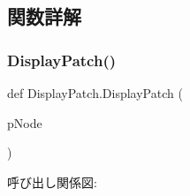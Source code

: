 \subsection{関数詳解}
\mbox{\label{namespace_display_patch_a48c0fc18609dd4a4a0694745adb652aa}} 
\subsubsection{\texorpdfstring{Display\+Patch()}{DisplayPatch()}}
{\footnotesize\ttfamily def Display\+Patch.\+Display\+Patch (\begin{DoxyParamCaption}\item[{}]{p\+Node }\end{DoxyParamCaption})}

呼び出し関係図\+:
